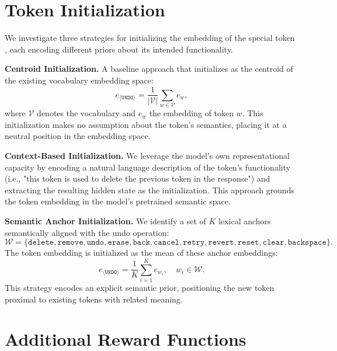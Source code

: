


\section{Token Initialization} \label{app: token initialization}
We investigate three strategies for initializing the embedding of the special token \bk, each encoding different priors about its intended functionality.

\textbf{Centroid Initialization.} 
A baseline approach that initializes \bk as the centroid of the existing vocabulary embedding space:
\begin{equation}
    e_{\langle \texttt{UNDO} \rangle} = \frac{1}{|\mathcal{V}|} \sum_{w \in \mathcal{V}} e_w,
\end{equation}
where $\mathcal{V}$ denotes the vocabulary and $e_w$ the embedding of token $w$. This initialization makes no assumption about the token's semantics, placing it at a neutral position in the embedding space.

\textbf{Context-Based Initialization.}
We leverage the model's own representational capacity by encoding a natural language description of the token's functionality (i.e., "this token is used to delete the previous token in the response") and extracting the resulting hidden state as the initialization. This approach grounds the token embedding in the model's pretrained semantic space.

\textbf{Semantic Anchor Initialization.} 
We identify a set of $K$ lexical anchors semantically aligned with the undo operation:
\begin{equation}
    \mathcal{W} = \{\texttt{delete}, \texttt{remove}, \texttt{undo}, \texttt{erase}, \texttt{back}, \texttt{cancel}, \texttt{retry}, \texttt{revert}, \texttt{reset}, \texttt{clear}, \texttt{backspace}\}.
\end{equation}
The token embedding is initialized as the mean of these anchor embeddings:
\begin{equation}
    e_{\langle \texttt{UNDO} \rangle} = \frac{1}{K} \sum_{i=1}^{K} e_{w_i}, \quad w_i \in \mathcal{W}.
\end{equation}
This strategy encodes an explicit semantic prior, positioning the new token proximal to existing tokens with related meaning.


\section{Additional Reward Functions} \label{app: additional reward}

